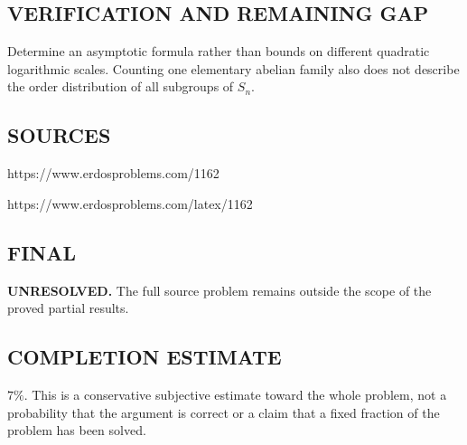 \subsection*{VERIFICATION AND REMAINING GAP}
Determine an asymptotic formula rather than bounds on different quadratic
logarithmic scales. Counting one elementary abelian family also does not describe
the order distribution of all subgroups of $S_n$.

\subsection*{SOURCES}
https://www.erdosproblems.com/1162

https://www.erdosproblems.com/latex/1162

\subsection*{FINAL}
\textbf{UNRESOLVED.} The full source problem remains outside the scope of the proved partial results.

\subsection*{COMPLETION ESTIMATE}
$7\%$. This is a conservative subjective estimate toward the whole problem, not a probability that the argument is correct or a claim that a fixed fraction of the problem has been solved.
